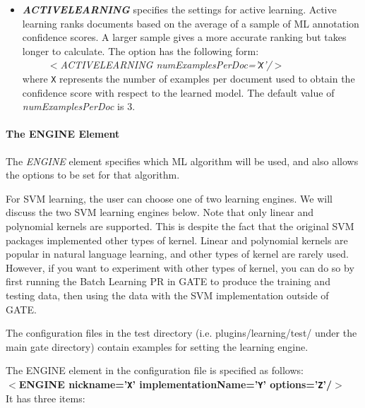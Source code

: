 \begin{itemize}
\item {\em {\bf ACTIVELEARNING}} specifies the settings for active learning.
Active learning ranks documents based on the average of a sample of ML annotation
confidence scores. A larger sample gives a more accurate ranking but takes longer
to calculate. The option has
the following form:\\
\ \ \ \ \ {\em $<$ACTIVELEARNING numExamplesPerDoc='\texttt{X}'/$>$}\\
where \texttt{X} represents the number of examples per document used to obtain
the confidence score with respect to the learned model. The default value of {\em
numExamplesPerDoc} is $3$.

\end{itemize}

\paragraph{The ENGINE Element}

The {\em ENGINE} element specifies which ML algorithm will be used, and also
allows the options to be set for that algorithm.

For SVM learning, the user can choose one of two learning engines. We will
discuss the two SVM learning engines below. Note that only linear and polynomial
kernels are supported. This is despite the fact that the original SVM packages
implemented other types of kernel. Linear and polynomial kernels are popular in
natural language learning, and other types of kernel are rarely used. However, if
you want to experiment with other types of kernel, you can do so by first running
the Batch Learning PR in GATE to produce the training and testing data, then
using the data with the SVM implementation outside of GATE.

The configuration files in the test directory (i.e. plugins/learning/test/ under
the main gate directory) contain examples for setting the learning engine.

The ENGINE element in the configuration file is specified as follows:\\
{\bf $<$ENGINE nickname='\texttt{X}' 
implementationName='\texttt{Y}' options='\texttt{Z}'/$>$}\\

It has three items:

